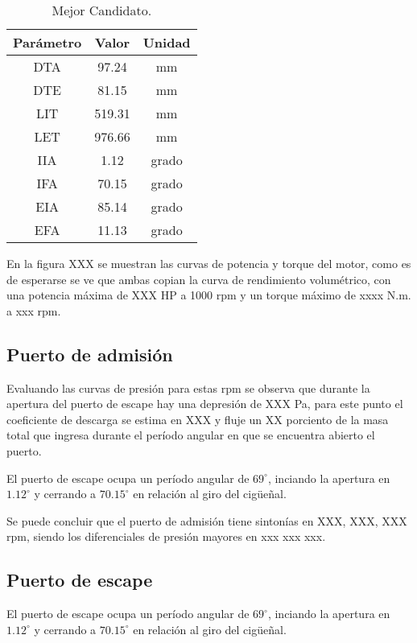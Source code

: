 \begin{table}
  \centering
  \begin{tabular}{ccc} \toprule
    Parámetro & Valor & Unidad \\ \midrule
    DTA & 97.24 & mm\\
    DTE & 81.15 & mm\\
    LIT & 519.31 & mm\\
    LET & 976.66 & mm\\
    IIA & 1.12 & grado\\
    IFA & 70.15 & grado\\
    EIA & 85.14 & grado\\
    EFA & 11.13 & grado\\ \bottomrule
  \end{tabular}
  \caption{Mejor Candidato.}\label{tab:resultado_primer_it}
\end{table}

En la figura XXX se muestran las curvas de potencia y torque del motor, como es
de esperarse se ve que ambas copian la curva de rendimiento volumétrico, con
una potencia máxima de XXX HP a 1000 rpm y un torque máximo de xxxx N.m. a xxx
rpm.


\subsection{Puerto de admisión}

Evaluando las curvas de presión para estas rpm se observa que durante la
apertura del puerto de escape hay una depresión de XXX Pa, para este punto el
coeficiente de descarga se estima en XXX y fluje un XX porciento de la masa
total que ingresa durante el período angular en que se encuentra abierto el
puerto.

El puerto de escape ocupa un período angular de $69^{\circ}$, inciando la
apertura en $1.12^{\circ}$ y cerrando a $70.15^{\circ}$ en relación al giro del
cigüeñal.

Se puede concluir que el puerto de admisión tiene sintonías en XXX, XXX, XXX
rpm, siendo los diferenciales de presión mayores en xxx xxx xxx.


\subsection{Puerto de escape}
%
El puerto de escape ocupa un período angular de $69^{\circ}$, inciando la
apertura en $1.12^{\circ}$ y cerrando a $70.15^{\circ}$ en relación al giro del
cigüeñal.

